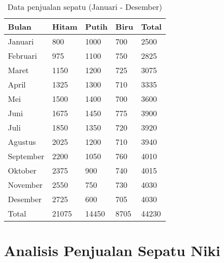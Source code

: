 \documentclass[letterpaper,11pt]{article}
\begin{document}
  \begin{table}[ht]
      \centering
      \small 
      \caption{Data penjualan sepatu (Januari - Desember)}
      \begin{tabu}{*{5}{X[c]}}
          \toprule
          Bulan & Hitam & Putih & Biru & Total \\
          \midrule
          Januari & 800 & 1000 & 700 & 2500 \\
          Februari & 975 & 1100 & 750 & 2825 \\
          Maret & 1150 & 1200 & 725 & 3075 \\
          April & 1325 & 1300 & 710 & 3335 \\
          Mei & 1500 & 1400 & 700 & 3600 \\
          Juni & 1675 & 1450 & 775 & 3900 \\
          Juli & 1850 & 1350 & 720 & 3920 \\
          Agustus & 2025 & 1200 & 710 & 3940 \\
          September & 2200 & 1050 & 760 & 4010 \\
          Oktober & 2375 & 900 & 740 & 4015 \\
          November & 2550 & 750 & 730 & 4030 \\
          Desember & 2725 & 600 & 705 & 4030 \\
          \bottomrule
          Total & 21075 & 14450 & 8705 & 44230\\
        \end{tabu}
  \end{table}
  
\section{Analisis Penjualan Sepatu Niki}
\end{document}
